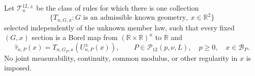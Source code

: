 Let \(\mathcal T^{12,\pm}_n\) be the class of rules for which there is one collection
\[
 \{T_{n,G,x}:G\text{ is an admissible known geometry},\ x\in\mathbb R^2\}
\]
selected independently of the unknown member law, such that every fixed \((G,x)\) section is a Borel map from \((\mathbb R\times\mathbb R)^n\) to \(\mathbb R\) and
\[
 \widehat\tau_{n,P}(x)=T_{n,G_P,x}(U^{\pm}_{n,P}(x)),
 \qquad P\in\mathcal P_{12}(p,\nu,L),\quad p\geq0,\quad x\in\mathcal B_P.
\]
No joint measurability, continuity, common modulus, or other regularity in \(x\) is imposed.